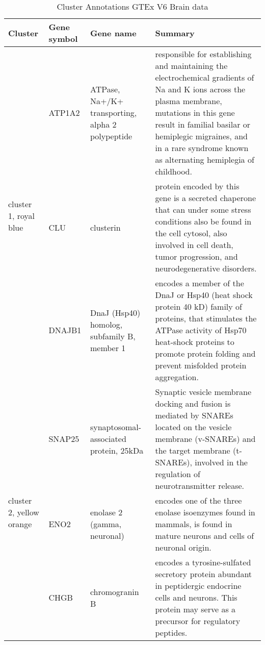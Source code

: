 \begin{table}[htp]
\begin{center}
\caption{Cluster Annotations GTEx V6 Brain data} \label{tab:tab2}
\begin{tabular}{|p{0.7in}|p{0.5in}|p{1.4in}|p{3.6in}|} 
\hline
Cluster & Gene symbol & Gene name & Summary \\
\hline
 \multirow{3}{4em}{\small{cluster 1, royal blue}}  &  \small{ATP1A2} & \footnotesize{ ATPase, Na+/K+ transporting, alpha 2 polypeptide} & \scriptsize{responsible for establishing and maintaining the electrochemical gradients of Na and K ions across the plasma membrane, mutations in this gene result in familial basilar or hemiplegic migraines, and in a rare syndrome known as alternating hemiplegia of childhood.}   \\ 
 					      & \small{CLU} &  \footnotesize{clusterin} & \scriptsize{protein encoded by this gene is a secreted chaperone that can under some stress conditions also be found in the cell cytosol, also involved in cell death, tumor progression, and neurodegenerative disorders.} \\
					      & \small{DNAJB1} & \footnotesize{DnaJ (Hsp40) homolog, subfamily B, member 1} & \scriptsize{encodes a member of the DnaJ or Hsp40 (heat shock protein 40 kD) family of proteins, that stimulates the ATPase activity of Hsp70 heat-shock proteins  to promote protein folding and prevent misfolded protein aggregation.} \\
\hline
 \multirow{3}{4em}{\small{cluster 2, yellow orange}} & \small{SNAP25} & \footnotesize{synaptosomal-associated protein, 25kDa} & \scriptsize{Synaptic vesicle membrane docking and fusion is mediated by SNAREs located on the vesicle membrane (v-SNAREs) and the target membrane (t-SNAREs), involved in the regulation of neurotransmitter release.}\\
 					    & \small{ENO2} & \footnotesize{enolase 2 (gamma, neuronal)} & \scriptsize{ encodes one of the three enolase isoenzymes found in mammals, is found in mature neurons and cells of neuronal origin.} \\
					    &  \small{CHGB} &  \footnotesize{chromogranin B} & \scriptsize{ encodes a tyrosine-sulfated secretory protein abundant in peptidergic endocrine cells and neurons. This protein may serve as a precursor for regulatory peptides.} \\
 \hline
 

\end{tabular}
\end{center}
\end{table}
